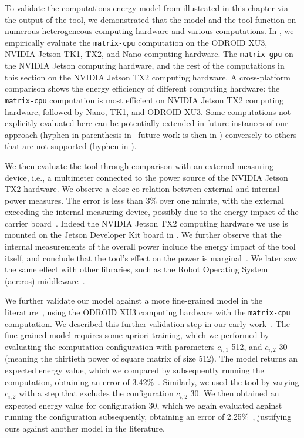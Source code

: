 To validate the computations energy model from  illustrated in this chapter via the output of the \powprof{} tool, we demonstrated that the model and the tool function on numerous heterogeneous computing hardware and various computations. In , we empirically evaluate the {\small\tt matrix-cpu} computation on the ODROID XU3, NVIDIA Jetson TK1, TX2, and Nano computing hardware. The {\small\tt matrix-gpu} on the NVIDIA Jetson computing hardware, and the rest of the computations in this section on the NVIDIA Jetson TX2 computing hardware. A cross-platform comparison shows the energy efficiency of different computing hardware: the {\small\tt matrix-cpu} computation is most efficient on NVIDIA Jetson TX2 computing hardware, followed by Nano, TK1, and ODROID XU3. Some computations not explicitly evaluated here can be potentially extended in future instances of our approach (hyphen in parenthesis in --future work is then in ) conversely to others that are not supported (hyphen in ). 

We then evaluate the \powprof{} tool through comparison with an external measuring device, i.e., a multimeter connected to the power source of the NVIDIA Jetson TX2 hardware. We observe a close co-relation between external and internal power measures. The error is less than 3\% over one minute, with the external exceeding the internal measuring device, possibly due to the energy impact of the carrier board~\citep{seewald2019coarse}. Indeed the NVIDIA Jetson TX2 computing hardware we use is mounted on the Jetson Developer Kit board in . We further observe that the internal measurements of the overall power include the energy impact of the tool itself, and conclude that the tool's effect on the power is marginal~\citep{seewald2019coarse}. We later saw the same effect with other libraries, such as the Robot Operating System (\Gls{acr:ros}) middleware~\citep{zamanakos2020energy}.

We further validate our model against a more fine-grained model in the literature~\citep{nunez2013enabling,nikov2015evaluation}, using the ODROID XU3 computing hardware with the {\small\tt matrix-cpu} computation. We described this further validation step in our early work~\citep{seewald2019coarse}. The fine-grained model requires some apriori training, which we performed by evaluating the computation configuration with parameters $c_{i,1}$ 512, and $c_{i,2}$ 30 (meaning the thirtieth power of square matrix of size 512). The model returns an expected energy value, which we compared by subsequently running the computation, obtaining an error of 3.42\%~\citep{seewald2019coarse}. Similarly, we used the \powprof{} tool by varying $c_{i,2}$ with a step that excludes the configuration $c_{i,2}$ 30. We then obtained an expected energy value for configuration 30, which we again evaluated against running the configuration subsequently, obtaining an error of 2.25\%~\citep{seewald2019coarse}, justifying ours against another model in the literature. 


